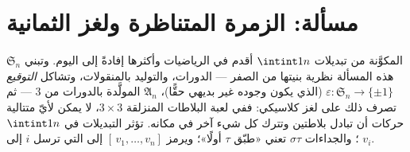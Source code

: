 \section{مسألة: الزمرة المتناظرة ولغز الثمانية}

\begin{problem}\label{pb:b1:structures:1}
 $\mathfrak S_n$ المكوَّنة من تبديلات $\intint1n$ أقدم
 في الرياضيات وأكثرها إفادةً إلى اليوم. وتبني هذه
المسألة نظرية بنيتها من الصفر --- الدورات، والتوليد
بالمنقولات، وتشاكل \emph{التوقيع}
$\varepsilon \colon \mathfrak S_n \to \{\pm1\}$ (الذي يكون وجوده
غير بديهي حقًّا)،  $\mathfrak A_n$
المولَّدة بالدورات من  $3$ --- ثم تصرف ذلك على لغز
كلاسيكي: ففي لعبة البلاطات المنزلقة $3 \times 3$، لا يمكن لأيّ متتالية حركات
أن تبادل بلاطتين وتترك كل شيء آخر في مكانه.
تؤثر التبديلات في $\intint1n$؛ والجداءات $\sigma\tau$ تعني
«طبّق $\tau$ أولًا»؛ ويرمز $[\,v_1, \dots, v_n]$ إلى
 التي ترسل $i$ إلى $v_i$.


\end{problem}
